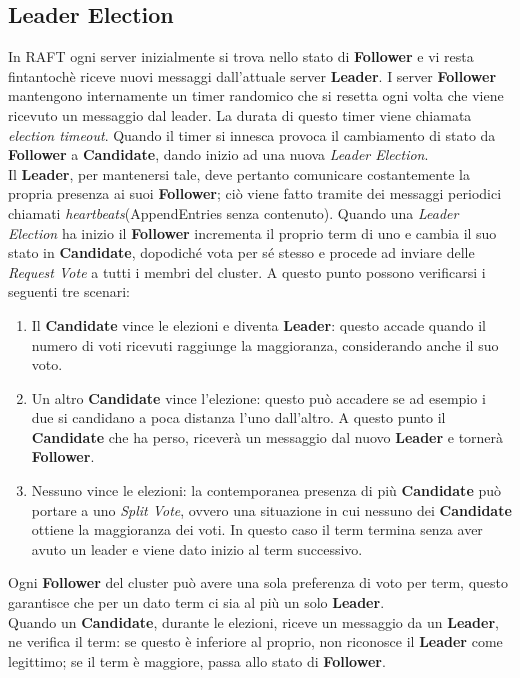 \subsection{Leader Election}
In RAFT ogni server inizialmente si trova nello stato di \textbf{Follower} e vi resta fintantochè riceve nuovi messaggi dall'attuale server \textbf{Leader}. I server \textbf{Follower} mantengono internamente un timer randomico che si resetta ogni volta che viene ricevuto un messaggio dal leader. La durata di questo timer viene chiamata \textit{election timeout}. Quando il timer si innesca provoca il cambiamento di stato da \textbf{Follower} a \textbf{Candidate}, dando inizio ad una nuova \textit{Leader Election}.
\\ 
Il \textbf{Leader}, per mantenersi tale, deve pertanto comunicare costantemente la propria presenza ai suoi \textbf{Follower}; ciò viene fatto tramite dei messaggi periodici chiamati \textit{heartbeats}(AppendEntries senza contenuto).
Quando una \textit{Leader Election} ha inizio il \textbf{Follower} incrementa il proprio term di uno e cambia il suo stato in \textbf{Candidate}, dopodiché vota per sé stesso e procede ad inviare delle \textit{Request Vote} a tutti i membri del cluster.
A questo punto possono verificarsi i seguenti tre scenari:
\begin{enumerate}
	\item Il \textbf{Candidate} vince le elezioni e diventa \textbf{Leader}: questo accade quando il numero di voti ricevuti raggiunge la maggioranza, considerando anche il suo voto.
	\item Un altro \textbf{Candidate} vince l'elezione: questo può accadere se ad esempio i due si candidano a poca distanza l'uno dall'altro. A questo punto il \textbf{Candidate} che ha perso, riceverà un messaggio dal nuovo \textbf{Leader} e tornerà \textbf{Follower}.
	\item Nessuno vince le elezioni: la contemporanea presenza di più \textbf{Candidate} può portare a uno \textit{Split Vote}, ovvero una situazione in cui nessuno dei \textbf{Candidate} ottiene la maggioranza dei voti. In questo caso il term termina senza aver avuto un leader e viene dato inizio al term successivo.
\end{enumerate}
Ogni \textbf{Follower} del cluster può avere una sola preferenza di voto per term, questo garantisce che per un dato term ci sia al più un solo \textbf{Leader}. \\
Quando un \textbf{Candidate}, durante le elezioni, riceve un messaggio da un \textbf{Leader}, ne verifica il term: se questo è inferiore al proprio, non riconosce il \textbf{Leader} come legittimo; se il term è maggiore, passa allo stato di \textbf{Follower}.
